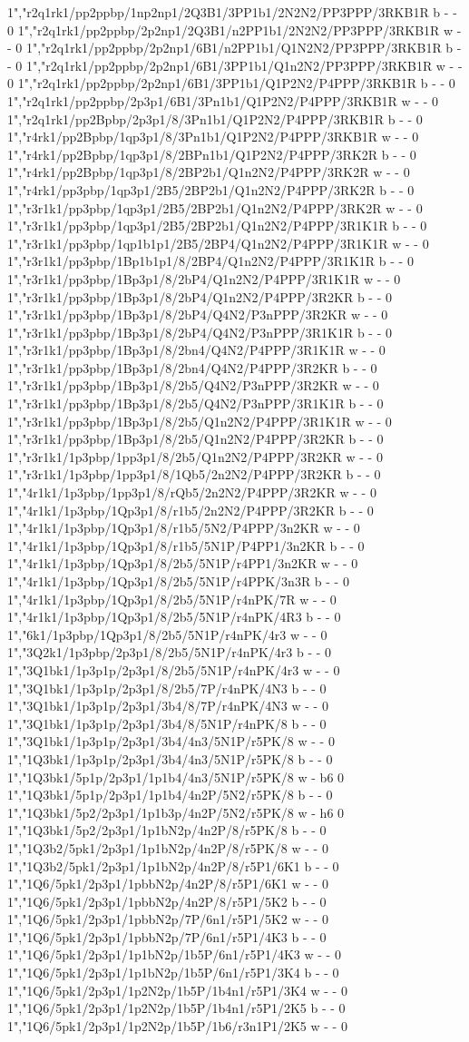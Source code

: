 \documentclass[11pt,a4paper]{article}
\begin{document}
1","r2q1rk1/pp2ppbp/1np2np1/2Q3B1/3PP1b1/2N2N2/PP3PPP/3RKB1R b - - 0 1","r2q1rk1/pp2ppbp/2p2np1/2Q3B1/n2PP1b1/2N2N2/PP3PPP/3RKB1R w - - 0 1","r2q1rk1/pp2ppbp/2p2np1/6B1/n2PP1b1/Q1N2N2/PP3PPP/3RKB1R b - - 0 1","r2q1rk1/pp2ppbp/2p2np1/6B1/3PP1b1/Q1n2N2/PP3PPP/3RKB1R w - - 0 1","r2q1rk1/pp2ppbp/2p2np1/6B1/3PP1b1/Q1P2N2/P4PPP/3RKB1R b - - 0 1","r2q1rk1/pp2ppbp/2p3p1/6B1/3Pn1b1/Q1P2N2/P4PPP/3RKB1R w - - 0 1","r2q1rk1/pp2Bpbp/2p3p1/8/3Pn1b1/Q1P2N2/P4PPP/3RKB1R b - - 0 1","r4rk1/pp2Bpbp/1qp3p1/8/3Pn1b1/Q1P2N2/P4PPP/3RKB1R w - - 0 1","r4rk1/pp2Bpbp/1qp3p1/8/2BPn1b1/Q1P2N2/P4PPP/3RK2R b - - 0 1","r4rk1/pp2Bpbp/1qp3p1/8/2BP2b1/Q1n2N2/P4PPP/3RK2R w - - 0 1","r4rk1/pp3pbp/1qp3p1/2B5/2BP2b1/Q1n2N2/P4PPP/3RK2R b - - 0 1","r3r1k1/pp3pbp/1qp3p1/2B5/2BP2b1/Q1n2N2/P4PPP/3RK2R w - - 0 1","r3r1k1/pp3pbp/1qp3p1/2B5/2BP2b1/Q1n2N2/P4PPP/3R1K1R b - - 0 1","r3r1k1/pp3pbp/1qp1b1p1/2B5/2BP4/Q1n2N2/P4PPP/3R1K1R w - - 0 1","r3r1k1/pp3pbp/1Bp1b1p1/8/2BP4/Q1n2N2/P4PPP/3R1K1R b - - 0 1","r3r1k1/pp3pbp/1Bp3p1/8/2bP4/Q1n2N2/P4PPP/3R1K1R w - - 0 1","r3r1k1/pp3pbp/1Bp3p1/8/2bP4/Q1n2N2/P4PPP/3R2KR b - - 0 1","r3r1k1/pp3pbp/1Bp3p1/8/2bP4/Q4N2/P3nPPP/3R2KR w - - 0 1","r3r1k1/pp3pbp/1Bp3p1/8/2bP4/Q4N2/P3nPPP/3R1K1R b - - 0 1","r3r1k1/pp3pbp/1Bp3p1/8/2bn4/Q4N2/P4PPP/3R1K1R w - - 0 1","r3r1k1/pp3pbp/1Bp3p1/8/2bn4/Q4N2/P4PPP/3R2KR b - - 0 1","r3r1k1/pp3pbp/1Bp3p1/8/2b5/Q4N2/P3nPPP/3R2KR w - - 0 1","r3r1k1/pp3pbp/1Bp3p1/8/2b5/Q4N2/P3nPPP/3R1K1R b - - 0 1","r3r1k1/pp3pbp/1Bp3p1/8/2b5/Q1n2N2/P4PPP/3R1K1R w - - 0 1","r3r1k1/pp3pbp/1Bp3p1/8/2b5/Q1n2N2/P4PPP/3R2KR b - - 0 1","r3r1k1/1p3pbp/1pp3p1/8/2b5/Q1n2N2/P4PPP/3R2KR w - - 0 1","r3r1k1/1p3pbp/1pp3p1/8/1Qb5/2n2N2/P4PPP/3R2KR b - - 0 1","4r1k1/1p3pbp/1pp3p1/8/rQb5/2n2N2/P4PPP/3R2KR w - - 0 1","4r1k1/1p3pbp/1Qp3p1/8/r1b5/2n2N2/P4PPP/3R2KR b - - 0 1","4r1k1/1p3pbp/1Qp3p1/8/r1b5/5N2/P4PPP/3n2KR w - - 0 1","4r1k1/1p3pbp/1Qp3p1/8/r1b5/5N1P/P4PP1/3n2KR b - - 0 1","4r1k1/1p3pbp/1Qp3p1/8/2b5/5N1P/r4PP1/3n2KR w - - 0 1","4r1k1/1p3pbp/1Qp3p1/8/2b5/5N1P/r4PPK/3n3R b - - 0 1","4r1k1/1p3pbp/1Qp3p1/8/2b5/5N1P/r4nPK/7R w - - 0 1","4r1k1/1p3pbp/1Qp3p1/8/2b5/5N1P/r4nPK/4R3 b - - 0 1","6k1/1p3pbp/1Qp3p1/8/2b5/5N1P/r4nPK/4r3 w - - 0 1","3Q2k1/1p3pbp/2p3p1/8/2b5/5N1P/r4nPK/4r3 b - - 0 1","3Q1bk1/1p3p1p/2p3p1/8/2b5/5N1P/r4nPK/4r3 w - - 0 1","3Q1bk1/1p3p1p/2p3p1/8/2b5/7P/r4nPK/4N3 b - - 0 1","3Q1bk1/1p3p1p/2p3p1/3b4/8/7P/r4nPK/4N3 w - - 0 1","3Q1bk1/1p3p1p/2p3p1/3b4/8/5N1P/r4nPK/8 b - - 0 1","3Q1bk1/1p3p1p/2p3p1/3b4/4n3/5N1P/r5PK/8 w - - 0 1","1Q3bk1/1p3p1p/2p3p1/3b4/4n3/5N1P/r5PK/8 b - - 0 1","1Q3bk1/5p1p/2p3p1/1p1b4/4n3/5N1P/r5PK/8 w - b6 0 1","1Q3bk1/5p1p/2p3p1/1p1b4/4n2P/5N2/r5PK/8 b - - 0 1","1Q3bk1/5p2/2p3p1/1p1b3p/4n2P/5N2/r5PK/8 w - h6 0 1","1Q3bk1/5p2/2p3p1/1p1bN2p/4n2P/8/r5PK/8 b - - 0 1","1Q3b2/5pk1/2p3p1/1p1bN2p/4n2P/8/r5PK/8 w - - 0 1","1Q3b2/5pk1/2p3p1/1p1bN2p/4n2P/8/r5P1/6K1 b - - 0 1","1Q6/5pk1/2p3p1/1pbbN2p/4n2P/8/r5P1/6K1 w - - 0 1","1Q6/5pk1/2p3p1/1pbbN2p/4n2P/8/r5P1/5K2 b - - 0 1","1Q6/5pk1/2p3p1/1pbbN2p/7P/6n1/r5P1/5K2 w - - 0 1","1Q6/5pk1/2p3p1/1pbbN2p/7P/6n1/r5P1/4K3 b - - 0 1","1Q6/5pk1/2p3p1/1p1bN2p/1b5P/6n1/r5P1/4K3 w - - 0 1","1Q6/5pk1/2p3p1/1p1bN2p/1b5P/6n1/r5P1/3K4 b - - 0 1","1Q6/5pk1/2p3p1/1p2N2p/1b5P/1b4n1/r5P1/3K4 w - - 0 1","1Q6/5pk1/2p3p1/1p2N2p/1b5P/1b4n1/r5P1/2K5 b - - 0 1","1Q6/5pk1/2p3p1/1p2N2p/1b5P/1b6/r3n1P1/2K5 w - - 0 
\end{document}
